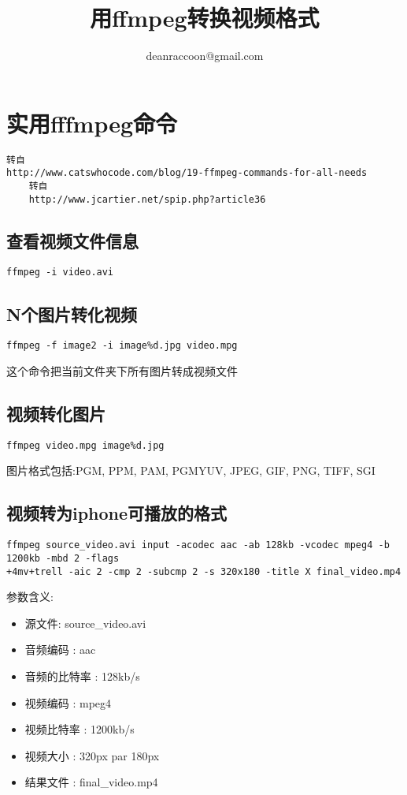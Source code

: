 \documentclass[adobefonts]{ctexart}
\title{\textbf{用ffmpeg转换视频格式}}
\author{deanraccoon@gmail.com}
\begin{document}
\maketitle
\tableofcontents
\newpage
\section{实用fffmpeg命令}
\begin{verbatim}
转自
http://www.catswhocode.com/blog/19-ffmpeg-commands-for-all-needs
	转自
	http://www.jcartier.net/spip.php?article36
\end{verbatim}
\subsection{查看视频文件信息} 
\begin{verbatim}
ffmpeg -i video.avi
\end{verbatim}
\subsection{N个图片转化视频}
\begin{verbatim}
ffmpeg -f image2 -i image%d.jpg video.mpg
\end{verbatim}
这个命令把当前文件夹下所有图片转成视频文件

\subsection{视频转化图片}
\begin{verbatim}
ffmpeg video.mpg image%d.jpg
\end{verbatim}
图片格式包括:PGM, PPM, PAM, PGMYUV, JPEG, GIF, PNG, TIFF, SGI
\subsection{视频转为iphone可播放的格式}
\begin{verbatim}
ffmpeg source_video.avi input -acodec aac -ab 128kb -vcodec mpeg4 -b 1200kb -mbd 2 -flags 
+4mv+trell -aic 2 -cmp 2 -subcmp 2 -s 320x180 -title X final_video.mp4
\end{verbatim}
参数含义:
\begin{itemize}
\item 源文件: source\_video.avi
\item 音频编码 : aac
\item 音频的比特率 : 128kb/s
\item 视频编码 : mpeg4
\item 视频比特率 : 1200kb/s
\item 视频大小 : 320px par 180px
\item 结果文件 : final\_video.mp4
\end{itemize}
\end{document}
